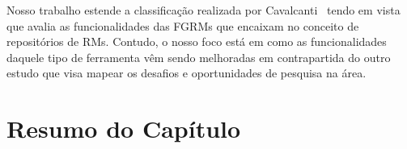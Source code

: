 Nosso trabalho estende a classificação realizada por
Cavalcanti~\cite{cavalcanti2014challenges} tendo em vista que avalia as
funcionalidades das FGRMs  que encaixam no conceito de repositórios de RMs.
Contudo, o nosso foco está em como as funcionalidades daquele tipo de ferramenta
vêm sendo melhoradas em contrapartida do outro estudo que visa mapear os
desafios e oportunidades de pesquisa na área.

\section{Resumo do Capítulo}
\label{sec:resumo_capitulo}